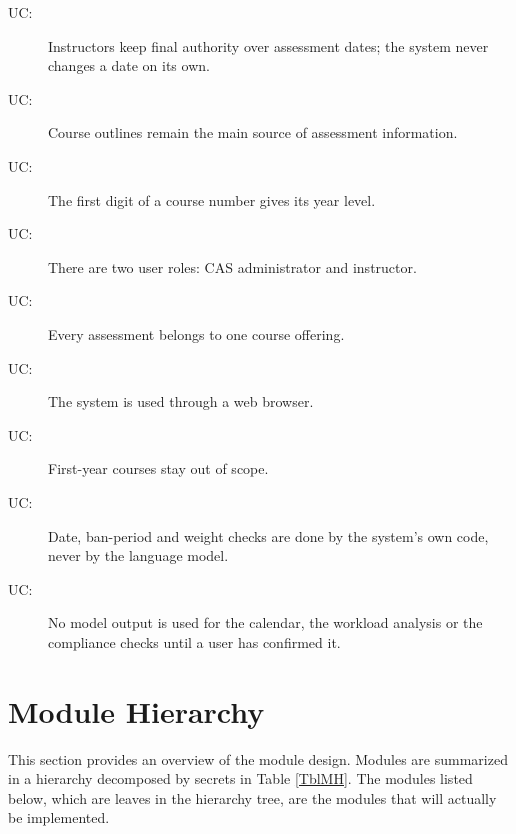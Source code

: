 \documentclass[12pt, titlepage]{article}
\newcounter{ucnum}
\newcommand{\uctheucnum}{UC\theucnum}
\begin{document}
\begin{description}
\item[ \uctheucnum \label{ucAuthority}:] Instructors
  keep final authority over assessment dates; the system never changes a date
  on its own.
\item[ \uctheucnum \label{ucOutline}:] Course outlines
  remain the main source of assessment information.
\item[ \uctheucnum \label{ucCode}:] The first digit of a
  course number gives its year level.
\item[ \uctheucnum \label{ucRoles}:] There are two user
  roles: CAS administrator and instructor.
\item[ \uctheucnum \label{ucOffering}:] Every
  assessment belongs to one course offering.
\item[ \uctheucnum \label{ucWeb}:] The system is used
  through a web browser.
\item[ \uctheucnum \label{ucFirstYear}:] First-year
  courses stay out of scope.
\item[ \uctheucnum \label{ucDeterministic}:] Date,
  ban-period and weight checks are done by the system's own code, never by the
  language model.
\item[ \uctheucnum \label{ucConfirm}:] No model output
  is used for the calendar, the workload analysis or the compliance checks
  until a user has confirmed it.
\end{description}


\section{Module Hierarchy} \label{SecMH}

This section provides an overview of the module design. Modules are summarized
in a hierarchy decomposed by secrets in Table \ref{TblMH}. The modules listed
below, which are leaves in the hierarchy tree, are the modules that will
actually be implemented.
\end{document}

